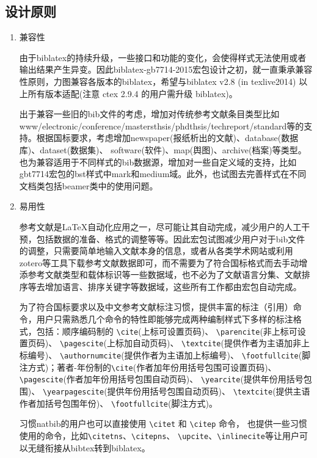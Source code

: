 \documentclass[11pt]{article} %
\begin{document}
\subsection{设计原则}

\begin{enumerate}
  \item 兼容性

由于biblatex的持续升级，一些接口和功能的变化，会使得样式无法使用或者输出结果产生异变。因此biblatex-gb7714-2015宏包设计之初，就一直秉承兼容性原则，力图兼容各版本的biblatex，希望与biblatex v2.8 (in texlive2014) 以上所有版本适配(注意 ctex 2.9.4 的用户需升级 biblatex)。

出于兼容一些旧的bib文件的考虑，增加对传统参考文献条目类型比如www/electronic/conference/mastersthsis/phdthsis/techreport/standard等的支持。根据国标要求，考虑增加newspaper(报纸析出的文献)、database(数据库)、dataset(数据集)、 software(软件)、map(舆图)、archive(档案)等类型。也为兼容适用于不同样式的bib数据源，增加对一些自定义域的支持，比如gbt7714宏包的bst样式中mark和medium域。此外，也试图去完善样式在不同文档类包括beamer类中的使用问题。

  \item 易用性

参考文献是\LaTeX{}自动化应用之一，尽可能让其自动完成，减少用户的人工干预，包括数据的准备、格式的调整等等。因此宏包试图减少用户对于bib文件的调整，只需要简单地输入文献本身的信息，或者从各类学术网站或利用zotero等工具下载参考文献数据即可，而不需要为了符合国标格式而去手动增添参考文献类型和载体标识等一些数据域，也不必为了文献语言分集、文献排序等去增加语言、排序关键字等数据域，这些所有工作都由宏包自动完成。

为了符合国标要求以及中文参考文献标注习惯，提供丰富的标注（引用）命令，用户只需熟悉几个命令的特性即能够完成两种编制样式下多样的标注格式，包括：顺序编码制的 \verb|\cite|(上标可设置页码)、 \verb|\parencite|(非上标可设置页码)、 \verb|\pagescite|(上标加自动页码)、 \verb|\textcite|(提供作者为主语加非上标编号)、 \verb|\authornumcite|(提供作者为主语加上标编号)、 \verb|\footfullcite|(脚注方式)；著者-年份制的\verb|\cite|(作者加年份用括号包围可设置页码)、 \verb|\pagescite|(作者加年份用括号包围自动页码)、
\verb|\yearcite|(提供年份用括号包围)、 \verb|\yearpagescite|(提供年份用括号包围自动页码)、
\verb|\textcite|(提供主语作者加括号包围年份)、 \verb|\footfullcite|(脚注方式)。

习惯natbib的用户也可以直接使用 \verb|\citet| 和 \verb|\citep| 命令，
也提供一些习惯使用的命令，比如\verb|\citetns|、\verb|\citepns|、
\verb|\upcite|、\verb|\inlinecite|等让用户可以无缝衔接从bibtex转到biblatex。


\end{enumerate}
\end{document}
